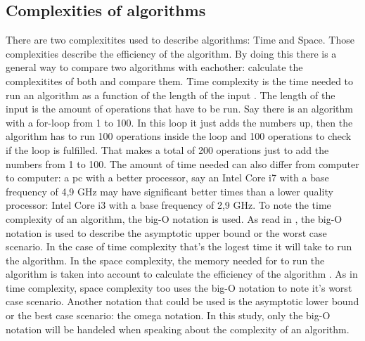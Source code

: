 \subsection{Complexities of algorithms}
\label{subsec:Complexities}
There are two complexitites used to describe algorithms: Time and Space. Those complexities describe the efficiency of the algorithm. By doing this there is a general way to compare two algorithms with eachother: calculate the complexitites of both and compare them.
Time complexity is the time needed to run an algorithm as a function of the length of the input \autocite{Timecomp}. The length of the input is the amount of operations that have to be run. Say there is an algorithm with a for-loop from 1 to 100.
In this loop it just adds the numbers up, then the algorithm has to run 100 operations inside the loop and 100 operations to check if the loop is fulfilled. That makes a total of 200 operations just to add the numbers from 1 to 100.
The amount of time needed can also differ from computer to computer: a pc with a better processor, say an Intel Core i7 with a base frequency of 4,9 GHz may have significant better times than a lower quality processor: Intel Core i3 with a base frequency of 2,9 GHz.
To note the time complexity of an algorithm, the big-O notation is used. As read in \textcite{Hidary_2019}, the big-O notation is used to describe the asymptotic upper bound or the worst case scenario. In the case of time complexity that's the logest time it will take to run the algorithm.
In the space complexity, the memory needed for to run the algorithm is taken into account to calculate the efficiency of the algorithm \autocite{Abhishek2021Ruimte}. As in time complexity, space complexity too uses the big-O notation to note it's worst case scenario. Another notation that could be used is the asymptotic lower bound or the best case scenario: the omega notation.
In this study, only the big-O notation will be handeled when speaking about the complexity of an algorithm.
